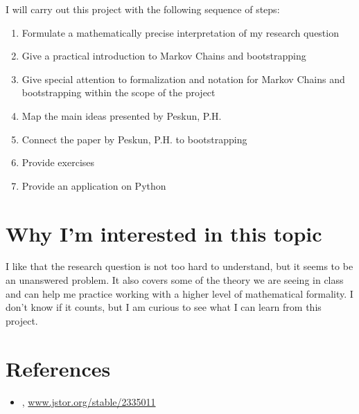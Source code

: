 \documentclass[]{STAT_547C}
\begin{document}
I will carry out this project with the following sequence of steps: 
\begin{enumerate}
	\item Formulate a mathematically precise interpretation of my research question
	\item Give a practical introduction to Markov Chains and bootstrapping
	\item Give special attention to formalization and notation for Markov Chains and bootstrapping within the scope of the project
  \item Map the main ideas presented by Peskun, P.H.
  \item Connect the paper by Peskun, P.H. to bootstrapping
  \item Provide exercises
  \item Provide an application on Python
\end{enumerate}


\section{Why I'm interested in this topic}

I like that the research question is not too hard to understand, but it seems to be an unanswered problem. It also covers some of the theory we are seeing in class and can help me practice working with a higher level of mathematical formality. I don't know if it counts, but I am curious to see what I can learn from this project.


\printbibliography
\section{References}
\begin{itemize}
\item \citet{Peskun, P. H. ``Optimum Monte-Carlo Sampling Using Markov Chains.'' Biometrika, vol. 60, no. 3, 1973, pp. 607-612. JSTOR}, \href{www.jstor.org/stable/2335011}{www.jstor.org/stable/2335011}
\end{itemize}
\end{document}

